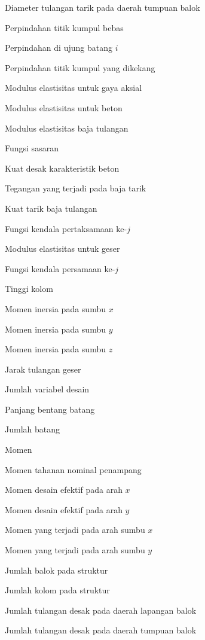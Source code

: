 \begin{description}[style=nextline,leftmargin=2.2cm,labelwidth=2cm]
\item[$diatltrtm$] Diameter tulangan tarik pada daerah tumpuan balok
\item[$DF$] Perpindahan titik kumpul bebas
\item[$DM_i$] Perpindahan di ujung batang $i$
\item[$DR$] Perpindahan titik kumpul yang dikekang
\item[$E$] Modulus elastisitas untuk gaya aksial
\item[$E_C$] Modulus elastisitas untuk beton
\item[$E_S$] Modulus elastisitas baja tulangan
\item[$f$] Fungsi sasaran
\item[$f_c'$] Kuat desak karakteristik beton
\item[$f_S'$] Tegangan yang terjadi pada baja tarik
\item[$f_y$] Kuat tarik baja tulangan
\item[$g_j$] Fungsi kendala pertaksamaan ke-$j$
\item[$G$] Modulus elastisitas untuk geser
\item[$h_j$] Fungsi kendala persamaan ke-$j$
\item[$H$] Tinggi kolom
\item[$I_x$] Momen inersia pada sumbu $x$
\item[$I_y$] Momen inersia pada sumbu $y$
\item[$I_z$] Momen inersia pada sumbu $z$
\item[$jaraktlgs$] Jarak tulangan geser
\item[$JVD$] Jumlah variabel desain
\item[$L$] Panjang bentang batang
\item[$m$] Jumlah batang
\item[$M$] Momen
\item[$M_n$] Momen tahanan nominal penampang
\item[$M_{ox}$] Momen desain efektif pada arah $x$
\item[$M_{oy}$] Momen desain efektif pada arah $y$
\item[$M_x$] Momen yang terjadi pada arah sumbu $x$
\item[$M_y$] Momen yang terjadi pada arah sumbu $y$
\item[$nB$] Jumlah balok pada struktur
\item[$nK$] Jumlah kolom pada struktur
\item[$ntldslp$] Jumlah tulangan desak pada daerah lapangan balok
\item[$ntldstm$] Jumlah tulangan desak pada daerah tumpuan balok

\end{description}
